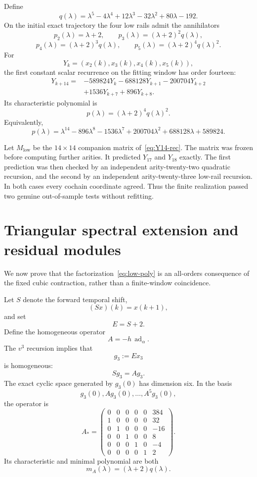 \documentclass[11pt]{amsart}
\begin{document}
Define
\[
q(\lambda)=
\lambda^5-4\lambda^4+12\lambda^3-32\lambda^2+80\lambda-192.
\]
On the initial exact trajectory the four low rails admit the annihilators
\[
p_2(\lambda)=\lambda+2,
\qquad
p_3(\lambda)=(\lambda+2)^2q(\lambda),
\]
\[
p_4(\lambda)=(\lambda+2)^3q(\lambda),
\qquad
p_5(\lambda)=(\lambda+2)^4q(\lambda)^2.
\]
For
\[
Y_k=(x_2(k),x_3(k),x_4(k),x_5(k)),
\]
the first constant scalar recurrence on the fitting window has order fourteen:
\begin{equation}\label{eq:Y14-rec}
\boxed{
\begin{aligned}
Y_{k+14}={}&-589824Y_k-688128Y_{k+1}-200704Y_{k+2}\\
&+1536Y_{k+7}+896Y_{k+8}.
\end{aligned}}
\end{equation}
Its characteristic polynomial is
\begin{equation}\label{eq:low-poly}
\boxed{
p(\lambda)=(\lambda+2)^4q(\lambda)^2.
}
\end{equation}
Equivalently,
\[
p(\lambda)=
\lambda^{14}-896\lambda^8-1536\lambda^7
+200704\lambda^2+688128\lambda+589824.
\]

Let $M_{\mathrm{low}}$ be the $14\times14$ companion matrix of~\eqref{eq:Y14-rec}.  The matrix was frozen before computing further arities.  It predicted $Y_{17}$ and $Y_{18}$ exactly.  The first prediction was then checked by an independent arity-twenty-two quadratic recursion, and the second by an independent arity-twenty-three low-rail recursion.  In both cases every cochain coordinate agreed.  Thus the finite realization passed two genuine out-of-sample tests without refitting.

\section{Triangular spectral extension and residual modules}\label{sec:spectral-extension}

We now prove that the factorization~\eqref{eq:low-poly} is an all-orders consequence of the fixed cubic contraction, rather than a finite-window coincidence.

Let $S$ denote the forward temporal shift,
\[
(Sx)(k)=x(k+1),
\]
and set
\[
E=S+2.
\]
Define the homogeneous operator
\[
A=-h\,\operatorname{ad}_\alpha.
\]
The $v^3$ recursion implies that
\[
g_3:=Ex_3
\]
is homogeneous:
\[
Sg_3=Ag_3.
\]
The exact cyclic space generated by $g_3(0)$ has dimension six.  In the basis
\[
g_3(0),Ag_3(0),\ldots,A^5g_3(0),
\]
the operator is
\begin{equation}\label{eq:Astar}
A_*=\begin{pmatrix}
0&0&0&0&0&384\\
1&0&0&0&0&32\\
0&1&0&0&0&-16\\
0&0&1&0&0&8\\
0&0&0&1&0&-4\\
0&0&0&0&1&2
\end{pmatrix}.
\end{equation}
Its characteristic and minimal polynomial are both
\begin{equation}\label{eq:mA}
\boxed{m_A(\lambda)=(\lambda+2)q(\lambda).}
\end{equation}
\end{document}
